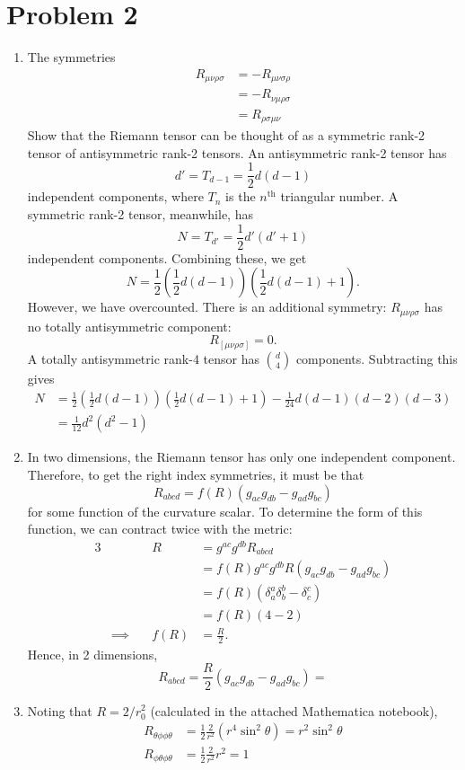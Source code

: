 \documentclass[12pt]{article}
\begin{document}
\section*{Problem 2}
\begin{enumerate}[label=(\alph*)]
    \item The symmetries 
    \begin{align*}
        R_{\mu\nu\rho\sigma} &= -R_{\mu\nu\sigma\rho} \\
        &= -R_{\nu\mu\rho\sigma} \\
        &= R_{\rho\sigma\mu\nu}
    \end{align*}
    Show that the Riemann tensor can be thought of as a symmetric rank-2 tensor of antisymmetric rank-2 tensors. An antisymmetric rank-2 tensor has
    \[ d' = T_{d-1} = \frac{1}{2}d(d-1) \]
    independent components, where $T_n$ is the $n^\text{th}$ triangular number. A symmetric rank-2 tensor, meanwhile, has
    \[ N = T_{d'} = \frac{1}{2}d'(d'+1)  \]
    independent components. Combining these, we get
    \[ N = \frac{1}{2}\left(\frac{1}{2}d(d-1)\right)\left(\frac{1}{2}d(d-1) + 1\right). \]
    However, we have overcounted. There is an additional symmetry: $R_{\mu\nu\rho\sigma}$ has no totally antisymmetric component:
    \[ R_{[\mu\nu\rho\sigma]} = 0. \]
    A totally antisymmetric rank-4 tensor has $\binom{d}{4}$ components. Subtracting this gives
    \begin{align*}
        N &= \frac{1}{2}\left(\frac{1}{2}d(d-1)\right)\left(\frac{1}{2}d(d-1) + 1\right) - \frac{1}{24}d(d-1)(d-2)(d-3) \\
        &= \frac{1}{12}d^2(d^2-1)
    \end{align*}

    \item In two dimensions, the Riemann tensor has only one independent component. Therefore, to get the right index symmetries, it must be that 
    \[ R_{abcd} = f(R)\left(g_{ac}g_{db} - g_{ad}g_{bc}\right) \]
    for some function of the curvature scalar. To determine the form of this function, we can contract twice with the metric:
    \begin{alignat*}{3}
        &\quad & R &= g^{ac}g^{db}R_{abcd}  \\
        &\quad &  &= f(R)g^{ac}g^{db}R\left(g_{ac}g_{db} - g_{ad}g_{bc}\right) \\
        &\quad &  &= f(R)(\delta_a^a\delta_b^b - \delta_c^c) \\
        &\quad &  &= f(R)(4 - 2) \\
        &\implies\quad & f(R) &= \frac{R}{2}.
    \end{alignat*}
    Hence, in 2 dimensions,
    \[ R_{abcd} = \frac{R}{2}\left(g_{ac}g_{db} - g_{ad}g_{bc}\right) =  \]

    \item Noting that $R = 2/r_0^2$ (calculated in the attached Mathematica notebook),
    \begin{align*}
        R_{\theta\phi\phi\theta} &= \frac{1}{2}\frac{2}{r^2}(r^4\sin^2\theta) = r^2\sin^2\theta \\
        R_{\phi\theta\phi\theta} &= \frac{1}{2}\frac{2}{r^2}r^2 = 1 
    \end{align*}
\end{enumerate}
\end{document}
